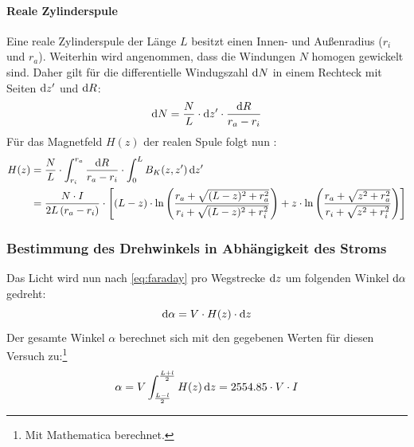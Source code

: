 \paragraph{Reale Zylinderspule}
Eine reale Zylinderspule der Länge $L$ besitzt einen Innen- und Außenradius ($r_i$ und $r_a$). 
Weiterhin wird angenommen, dass die Windungen $N$ homogen gewickelt sind. Daher gilt für die differentielle Windugszahl $\mathrm{d} N$ in einem 
Rechteck mit Seiten $\mathrm{d} z'$ und $\mathrm{d} R$:
\begin{equation}
  \mathrm{d} N = \frac{N}{L} \cdot \mathrm{d} z' \cdot \frac{\mathrm{d} R}{r_a - r_i}
\end{equation}
Für das Magnetfeld $H(z)$ der realen Spule folgt nun \cite{herrmann}:
\begin{equation}
  \label{eq:hreal}
  \begin{split}
    H(z) &= \frac{N}{L} \cdot \int_{r_i}^{r_a} \frac{\mathrm{d} R}{r_a - r_i} \cdot \int_{0}^{L} B_K(z, z')\, \mathrm{d} z'\\
    &=\frac{N \cdot I}{2 L \left( r_a - r_i \right) } \cdot \left[ 
  	      (L-z) \cdot \ln \left( \frac{r_a + \sqrt{(L-z)^2  +r_a^2}}{r_i + \sqrt{(L-z)^2 + r_i^2}} \right) + 
  		  z \cdot \ln \left( \frac{r_a + \sqrt{z^2  +r_a^2}}{r_i + \sqrt{z^2 + r_i^2}} \right)  \right]
  \end{split}
\end{equation}
\subsubsection{Bestimmung des Drehwinkels in Abhängigkeit des Stroms}
\label{subsub:alpha}
Das Licht wird nun nach \autoref{eq:faraday} pro Wegstrecke $\mathrm{d} z$ um folgenden Winkel $\mathrm{d} \alpha$ gedreht:
\begin{equation}
  \mathrm{d} \alpha = V \cdot H(z) \cdot \mathrm{d} z
\end{equation}
Der gesamte Winkel $\alpha$ berechnet sich mit den gegebenen Werten \cite{manual} für diesen Versuch zu:\footnote{Mit Mathematica berechnet.}
\begin{equation}
  \label{eq:verdet}
  \alpha = V \int_{\frac{L-l}{2}}^{\frac{L+l}{2}} H(z)\, \mathrm{d} z = 2554.85 \cdot V \cdot I 
\end{equation}